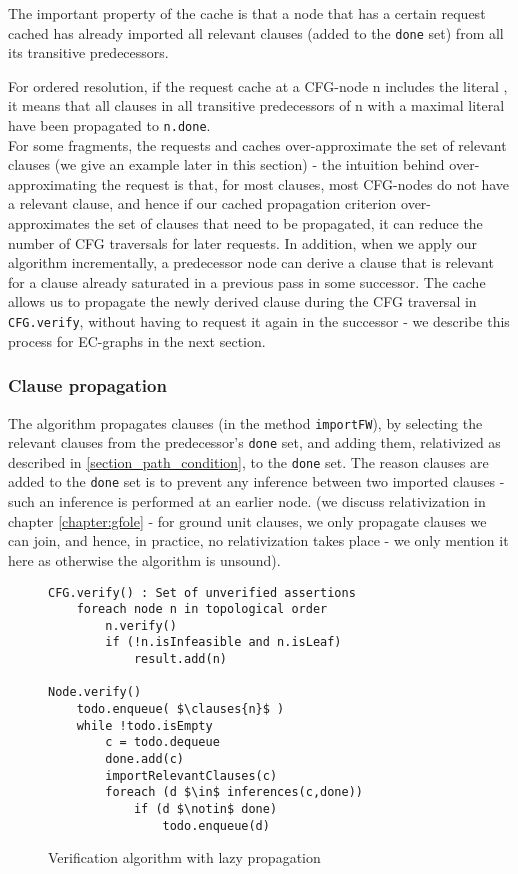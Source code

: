 The important property of the cache is that a node that has a certain request cached has already imported all relevant clauses (added to the \lstinline|done| set) from all its transitive predecessors.

For ordered resolution, if the request cache at a CFG-node n includes the literal , it means that all clauses in all transitive predecessors of n with a maximal literal  have been propagated to \lstinline|n.done|.\\
For some fragments, the requests and caches over-approximate the set of relevant clauses (we give an example later in this section) - 
the intuition behind over-approximating the request is that, for most clauses, most CFG-nodes do not have a relevant clause, 
and hence if our cached propagation criterion over-approximates the set of clauses that need to be propagated, it can reduce the number of CFG traversals for later requests. 
In addition, when we apply our algorithm incrementally, a predecessor node can derive a clause that is relevant for a clause already saturated in a previous pass in some successor. The cache allows us to propagate the newly derived clause during the CFG traversal in \lstinline|CFG.verify|, without having to request it again in the successor - we describe this process for EC-graphs in the next section.

\subsubsection*{Clause propagation}
The algorithm propagates clauses (in the method \lstinline|importFW|), by selecting the relevant clauses from the predecessor's \lstinline|done| set, and adding them, relativized as described in \ref{section_path_condition}, to the \lstinline|done| set.
The reason clauses are added to the \lstinline|done| set is to prevent any inference between two imported clauses - such an inference is performed at an earlier node. 
 (we discuss relativization in chapter \ref{chapter:gfole} - for ground unit clauses, we only propagate clauses we can join, and hence, in practice, no relativization takes place - we only mention it here as otherwise the algorithm is unsound). 

\begin{figure}
\begin{lstlisting}
CFG.verify() : Set of unverified assertions
	foreach node n in topological order
		n.verify()
		if (!n.isInfeasible and n.isLeaf)
			result.add(n)

Node.verify()
	todo.enqueue( $\clauses{n}$ )
	while !todo.isEmpty
		c = todo.dequeue
		done.add(c)
		importRelevantClauses(c)
		foreach (d $\in$ inferences(c,done))
			if (d $\notin$ done)
				todo.enqueue(d)
\end{lstlisting}
\caption{Verification algorithm with lazy propagation\\
}
\label{verification_algorithm_v2}
\end{figure}

